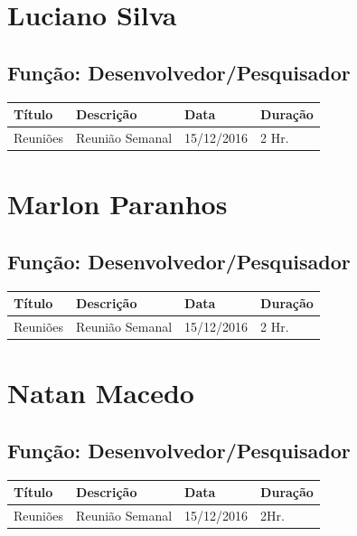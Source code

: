 \documentclass[a4paper, 12pt]{article}
\newcommand\datareuniao{15/12/2016}
\begin{document}


\section*{Luciano Silva}
\subsection*{Função: Desenvolvedor/Pesquisador}

\begin{tabularx}{\linewidth}{l|X|l|l} \toprule
	\bfseries Título & \bfseries Descrição & \bfseries Data & \bfseries Duração
	\\ \midrule
	Reuniões & Reunião Semanal & \datareuniao & 2 Hr.
	\\ \bottomrule
\end{tabularx}



\section*{Marlon Paranhos}
\subsection*{Função: Desenvolvedor/Pesquisador}

\begin{tabularx}{\linewidth}{l|X|l|l} \toprule
	\bfseries Título & \bfseries Descrição & \bfseries Data & \bfseries Duração
	\\ \midrule
	Reuniões & Reunião Semanal & \datareuniao & 2 Hr.
	\\ \bottomrule
\end{tabularx}



\section*{Natan Macedo}
\subsection*{Função: Desenvolvedor/Pesquisador}

\begin{tabularx}{\linewidth}{l|X|l|l} \toprule
	\bfseries Título & \bfseries Descrição & \bfseries Data & \bfseries Duração
	\\ \midrule
	Reuniões & Reunião Semanal & \datareuniao &  2Hr.
	\\ \midrule
\end{tabularx}
\clearpage
\end{document}

